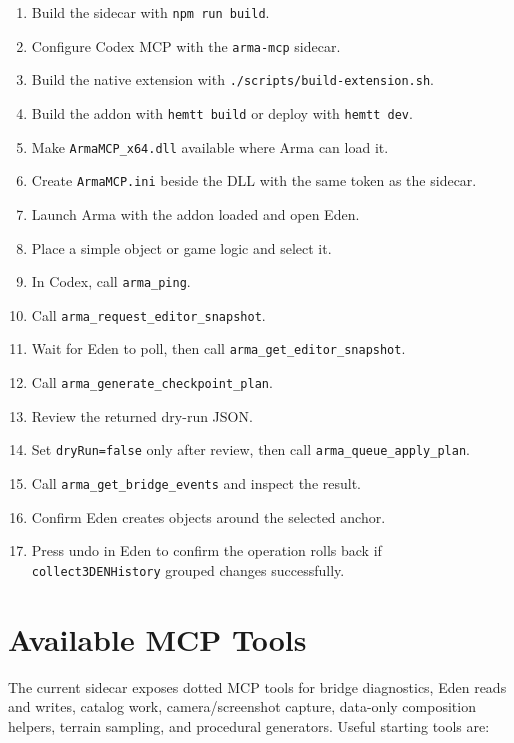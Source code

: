 \documentclass[11pt]{article}
\newcommand{\code}[1]{\texttt{#1}}
\begin{document}
\begin{enumerate}
  \item Build the sidecar with \code{npm run build}.
  \item Configure Codex MCP with the \code{arma-mcp} sidecar.
  \item Build the native extension with \code{./scripts/build-extension.sh}.
  \item Build the addon with \code{hemtt build} or deploy with \code{hemtt dev}.
  \item Make \code{ArmaMCP\_x64.dll} available where Arma can load it.
  \item Create \code{ArmaMCP.ini} beside the DLL with the same token as the sidecar.
  \item Launch Arma with the addon loaded and open Eden.
  \item Place a simple object or game logic and select it.
  \item In Codex, call \code{arma\_ping}.
  \item Call \code{arma\_request\_editor\_snapshot}.
  \item Wait for Eden to poll, then call \code{arma\_get\_editor\_snapshot}.
  \item Call \code{arma\_generate\_checkpoint\_plan}.
  \item Review the returned dry-run JSON.
  \item Set \code{dryRun=false} only after review, then call \code{arma\_queue\_apply\_plan}.
  \item Call \code{arma\_get\_bridge\_events} and inspect the result.
  \item Confirm Eden creates objects around the selected anchor.
  \item Press undo in Eden to confirm the operation rolls back if
        \code{collect3DENHistory} grouped changes successfully.
\end{enumerate}

\section{Available MCP Tools}

The current sidecar exposes dotted MCP tools for bridge diagnostics, Eden reads
and writes, catalog work, camera/screenshot capture, data-only composition
helpers, terrain sampling, and procedural generators. Useful starting tools are:
\end{document}
